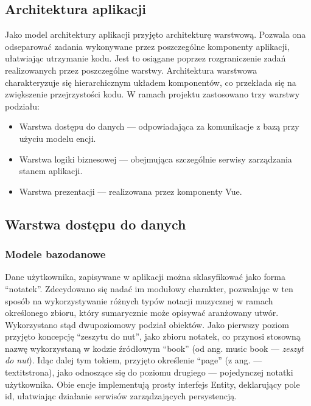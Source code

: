 \subsection{Architektura aplikacji}
Jako model architektury aplikacji przyjęto architekturę warstwową. Pozwala ona odseparować zadania wykonywane przez
poszczególne komponenty aplikacji, ułatwiając utrzymanie kodu. Jest to osiągane poprzez rozgraniczenie zadań
realizowanych przez poszczególne warstwy. Architektura warstwowa charakteryzuje się hierarchicznym układem komponentów,
co przekłada się na zwiększenie przejrzystości kodu.
W ramach projektu zastosowano trzy warstwy podziału:

\begin{itemize}
	\item Warstwa dostępu do danych — odpowiadająca za komunikacje z bazą przy użyciu modelu encji.
	\item Warstwa logiki biznesowej — obejmująca szczególnie serwisy zarządzania stanem aplikacji.
	\item Warstwa prezentacji — realizowana przez komponenty Vue.
\end{itemize}

\subsection{Warstwa dostępu do danych}
\subsubsection{Modele bazodanowe}
Dane użytkownika, zapisywane w aplikacji można sklasyfikować jako forma \enquote{notatek}.
Zdecydowano się nadać im modułowy charakter, pozwalając w ten sposób na wykorzystywanie różnych typów notacji muzycznej
w ramach określonego zbioru, który sumarycznie może opisywać aranżowany utwór.
Wykorzystano stąd dwupoziomowy podział obiektów. Jako pierwszy poziom przyjęto koncepcję
\enquote{zeszytu do nut}, jako zbioru notatek,
co przynosi stosowną nazwę wykorzystaną w kodzie źródłowym \enquote{book} (od ang.
music book — \textit{zeszyt do nut}).
Idąc dalej tym tokiem, przyjęto określenie \enquote{page} (z ang. — textit{strona}),
jako odnoszące się do poziomu drugiego — pojedynczej notatki użytkownika.
Obie encje implementują prosty interfejs Entity, deklarujący pole id,
ułatwiając działanie serwisów zarządzających persystencją.

